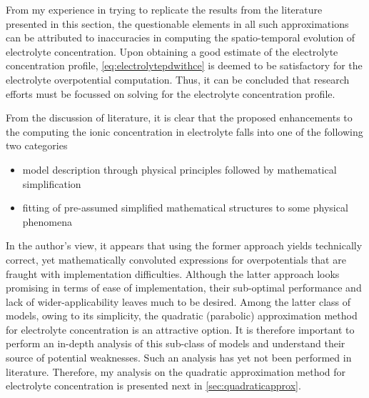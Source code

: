 
From  my experience  in  trying to  replicate the  results  from the  literature
presented in this section, the  questionable elements in all such approximations
can be  attributed to  inaccuracies in  computing the  spatio-temporal evolution
of  electrolyte   concentration.  Upon   obtaining  a   good  estimate   of  the
electrolyte concentration profile, \cref{eq:electrolytepdwithce} is deemed to be
satisfactory  for the  electrolyte overpotential  computation. Thus,  it can  be
concluded that research efforts must be  focussed on solving for the electrolyte
concentration profile.

From the discussion of literature, it is clear that the proposed enhancements to
the  computing the  ionic concentration  in electrolyte  falls into  one of  the
following two categories
\begin{itemize}[topsep=0pt,partopsep=0pt,itemsep=0pt]
    \item model description through physical principles followed by mathematical
        simplification
    \item fitting of pre-assumed simplified mathematical structures to some
        physical phenomena
\end{itemize}

In   the  author's   view,   it   appears  that   using   the  former   approach
yields  technically  correct,  yet  mathematically  convoluted  expressions  for
overpotentials that  are fraught with implementation  difficulties. Although the
latter  approach looks  promising  in  terms of  ease  of implementation,  their
sub-optimal  performance  and lack  of  wider-applicability  leaves much  to  be
desired.  Among  the latter  class  of  models,  owing  to its  simplicity,  the
quadratic (parabolic)  approximation method for electrolyte  concentration is an
attractive option. It is therefore important  to perform an in-depth analysis of
this sub-class  of models and  understand their source of  potential weaknesses.
Such  an analysis  has  yet  not been  performed  in  literature. Therefore,  my
analysis on the quadratic approximation  method for electrolyte concentration is
presented next in \cref{sec:quadraticapprox}.





